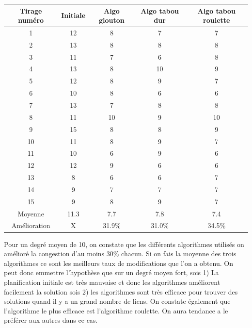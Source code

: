 \documentclass[a4paper,11pt]{article}
\begin{document}
	\begin{tabular}{|c|c|c|c|c|}
  		\hline
  		Tirage numéro & Initiale & Algo glouton & Algo tabou dur & Algo tabou roulette\\
  		\hline
  		1 & 12 & 8 & 7 & 7\\
  		\hline
  		2 & 13& 8& 8&8\\
  		\hline
  		3 & 11 & 7 & 6 & 8\\
  		\hline
  		4 & 13 & 8 & 10 & 9\\
  		\hline
  		5 & 12 & 8 & 9 & 7\\
  		\hline
  		6 & 10 & 8 & 6 & 6\\
  		\hline
  		7 & 13 & 7 & 8 & 8\\
  		\hline
  		8 & 11 & 10 & 9 & 10\\
  		\hline
  		9 & 15 & 8 & 8 & 9\\
  		\hline
  		10 & 11 & 8 & 9 & 7\\
  		\hline
  		11 & 10 & 6 & 9 & 6\\
  		\hline
  		12 & 12 & 9 & 6 & 6\\
  		\hline
  		13 & 8 & 6 & 6 & 7\\
  		\hline
  		14 & 9 & 7 & 7 & 7\\
  		\hline
  		15 & 9 & 8 & 9 & 7\\
  		\hline
  		Moyenne  &11.3  &7.7  &7.8 &  7.4\\
  		\hline
  		Amélioration & X & 31.9\% & 31.0\% & 34.5\%\\
  		\hline
	\end{tabular}
	Pour un degré moyen de 10, on constate que les différents algorithmes utilisés on amélioré la congestion d'au moins 30\% chacun. Si on fais la moyenne des trois algorithmes ce sont les meilleurs taux de modifications que l'on a obtenu. On peut donc emmettre l'hypothèse que sur un degré moyen fort, sois 1) La planification initiale est très mauvaise et donc les algorithmes améliorent facilement la solution sois 2) les algorithmes sont très efficace pour trouver des solutions quand il y a un grand nombre de liens. On constate également que l'algorithme le plus efficace est l'algorithme roulette. On aura tendance a le préférer aux autres dans ce cas.
\end{document}
